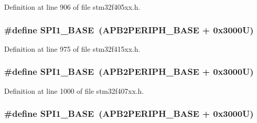 Definition at line 906 of file stm32f405xx.\+h.

\subsubsection[{\texorpdfstring{S\+P\+I1\+\_\+\+B\+A\+SE}{SPI1_BASE}}]{\setlength{\rightskip}{0pt plus 5cm}\#define S\+P\+I1\+\_\+\+B\+A\+SE~({\bf A\+P\+B2\+P\+E\+R\+I\+P\+H\+\_\+\+B\+A\+SE} + 0x3000\+U)}\hypertarget{group___peripheral__registers__structures_ga50cd8b47929f18b05efbd0f41253bf8d}{}\label{group___peripheral__registers__structures_ga50cd8b47929f18b05efbd0f41253bf8d}


Definition at line 975 of file stm32f415xx.\+h.

\subsubsection[{\texorpdfstring{S\+P\+I1\+\_\+\+B\+A\+SE}{SPI1_BASE}}]{\setlength{\rightskip}{0pt plus 5cm}\#define S\+P\+I1\+\_\+\+B\+A\+SE~({\bf A\+P\+B2\+P\+E\+R\+I\+P\+H\+\_\+\+B\+A\+SE} + 0x3000\+U)}\hypertarget{group___peripheral__registers__structures_ga50cd8b47929f18b05efbd0f41253bf8d}{}\label{group___peripheral__registers__structures_ga50cd8b47929f18b05efbd0f41253bf8d}


Definition at line 1000 of file stm32f407xx.\+h.

\subsubsection[{\texorpdfstring{S\+P\+I1\+\_\+\+B\+A\+SE}{SPI1_BASE}}]{\setlength{\rightskip}{0pt plus 5cm}\#define S\+P\+I1\+\_\+\+B\+A\+SE~({\bf A\+P\+B2\+P\+E\+R\+I\+P\+H\+\_\+\+B\+A\+SE} + 0x3000\+U)}\hypertarget{group___peripheral__registers__structures_ga50cd8b47929f18b05efbd0f41253bf8d}{}\label{group___peripheral__registers__structures_ga50cd8b47929f18b05efbd0f41253bf8d}


